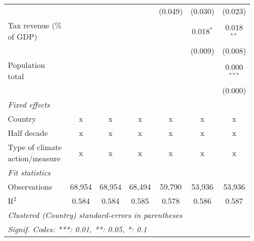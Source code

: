 \begin{tabular}{lcccccc}
                                                &              &                &                & (0.049)        & (0.030)        & (0.023)\\   
   Tax revenue (\% of GDP)                      &              &                &                &                & 0.018$^{*}$    & 0.018$^{**}$\\   
                                                &              &                &                &                & (0.009)        & (0.008)\\   
   Population total                             &              &                &                &                &                & 0.000$^{***}$\\   
                                                &              &                &                &                &                & (0.000)\\   
   \emph{Fixed effects}\\
   Country                                      & x            & x              & x              & x              & x              & x\\  
   Half decade                                  & x            & x              & x              & x              & x              & x\\  
   Type of climate action/measure               & x            & x              & x              & x              & x              & x\\  
   \midrule \emph{Fit statistics}\\
   Observations                                 & 68,954       & 68,954         & 68,494         & 59,790         & 53,936         & 53,936\\  
   R$^2$                                        & 0.584        & 0.584          & 0.585          & 0.578          & 0.586          & 0.587\\  
   \midrule
   \multicolumn{7}{l}{\emph{Clustered (Country) standard-errors in parentheses}}\\
   \multicolumn{7}{l}{\emph{Signif. Codes: ***: 0.01, **: 0.05, *: 0.1}}\\
\end{tabular}
\par\endgroup


